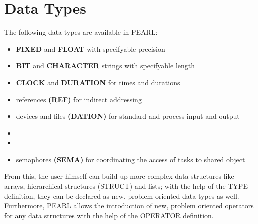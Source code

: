 \section{Data Types}   %

The following data types are available in PEARL:

\begin{itemize}
\item {\bf FIXED} and {\bf FLOAT} with specifyable precision
\item {\bf BIT} and {\bf CHARACTER} strings with specifyable length
\item {\bf CLOCK} and {\bf DURATION} for times and durations
\item references {\bf (REF)} for indirect addressing
\item devices and files {\bf (DATION)} for standard and process input and
      output
\item {}
\item {}
\item semaphores {\bf (SEMA)}  for
      coordinating the access of tasks to shared object
\end{itemize}

From this, the user himself can build up more complex data structures
like arrays, hierarchical structures (STRUCT) and lists; with the help
of the TYPE definition, they can be declared as new, problem oriented
data types as well. Furthermore, PEARL allows the introduction of new,
problem oriented operators for any data structures with the help of the
OPERATOR definition.

